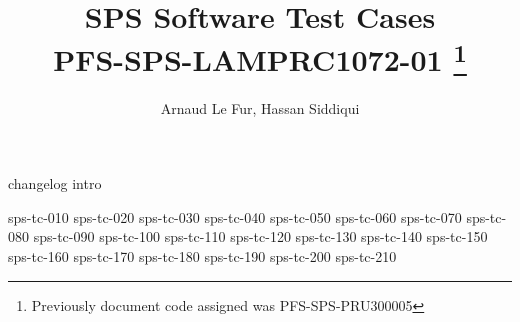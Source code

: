 \documentclass[12pt]{article}
\begin{document}
\title{\acrshort{SPS} Software Test Cases \\ \large PFS-SPS-LAMPRC1072-01 
\footnote{Previously document code assigned was PFS-SPS-PRU300005}}
\author{Arnaud Le Fur, Hassan Siddiqui}
\maketitle

\tableofcontents
\newpage

%
%
{changelog}
{intro}
\newpage

%
%
{sps-tc-010}
\newpage
{sps-tc-020}
\newpage
{sps-tc-030}
\newpage
{sps-tc-040}
\newpage
{sps-tc-050}
\newpage
{sps-tc-060}
\newpage
{sps-tc-070}
\newpage
{sps-tc-080}
\newpage
{sps-tc-090}
\newpage
{sps-tc-100}
\newpage
{sps-tc-110}
\newpage
{sps-tc-120}
\newpage
{sps-tc-130}
\newpage
{sps-tc-140}
\newpage
{sps-tc-150}
\newpage
{sps-tc-160}
\newpage
{sps-tc-170}
\newpage
{sps-tc-180}
\newpage
{sps-tc-190}
\newpage
{sps-tc-200}
\newpage
{sps-tc-210}
\newpage
%
%
\printglossary[type=\acronymtype]
\printglossary
\end{document}
